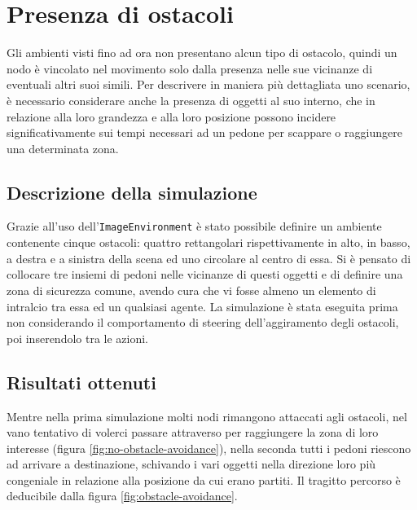 \section{Presenza di ostacoli}
Gli ambienti visti fino ad ora non presentano alcun tipo di ostacolo, quindi un nodo è vincolato nel movimento solo dalla presenza nelle sue vicinanze di eventuali altri suoi simili. \newline
Per descrivere in maniera più dettagliata uno scenario, è necessario considerare anche la presenza di oggetti al suo interno, che in relazione alla loro grandezza e alla loro posizione possono incidere significativamente sui tempi necessari ad un pedone per scappare o raggiungere una determinata zona.

\subsection{Descrizione della simulazione}
Grazie all'uso dell'\texttt{ImageEnvironment} è stato possibile definire un ambiente contenente cinque ostacoli: quattro rettangolari rispettivamente in alto, in basso, a destra e a sinistra della scena ed uno circolare al centro di essa. \newline
Si è pensato di collocare tre insiemi di pedoni nelle vicinanze di questi oggetti e di definire una zona di sicurezza comune, avendo cura che vi fosse almeno un elemento di intralcio tra essa ed un qualsiasi agente. \newline
La simulazione è stata eseguita prima non considerando il comportamento di steering dell'aggiramento degli ostacoli, poi inserendolo tra le azioni.

\subsection{Risultati ottenuti}
Mentre nella prima simulazione molti nodi rimangono attaccati agli ostacoli, nel vano tentativo di volerci passare attraverso per raggiungere la zona di loro interesse (figura \ref{fig:no-obstacle-avoidance}), nella seconda tutti i pedoni riescono ad arrivare a destinazione, schivando i vari oggetti nella direzione loro più congeniale in relazione alla posizione da cui erano partiti. Il tragitto percorso è deducibile dalla figura \ref{fig:obstacle-avoidance}.

